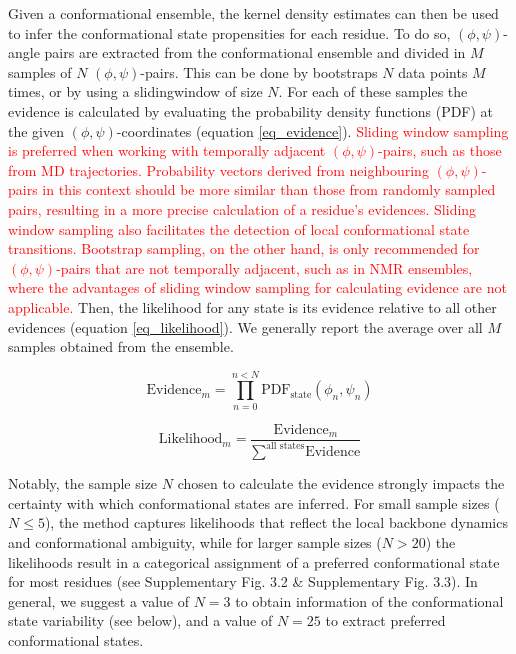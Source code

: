 Given a conformational ensemble, the kernel density estimates can then be used to infer the conformational state propensities for each residue. To do so, $(\phi, \psi)$-angle pairs  are extracted from the conformational ensemble and divided in $M$ samples of $N$ $(\phi, \psi)$-pairs. This can be done by \glspl{bootstrap} $N$ data points $M$ times, or by using a \gls{slidingwindow} of size $N$. For each of these samples the evidence is calculated by evaluating the probability density functions (PDF) at the given $(\phi, \psi)$-coordinates (equation \ref{eq_evidence}). \textcolor{red}{Sliding window sampling is preferred when working with temporally adjacent $(\phi, \psi)$-pairs, such as those from MD trajectories. Probability vectors derived from neighbouring $(\phi, \psi)$-pairs in this context should be more similar than those from randomly sampled pairs, resulting in a more precise calculation of a residue's evidences. Sliding window sampling also facilitates the detection of local conformational state transitions. Bootstrap sampling, on the other hand, is only recommended for $(\phi, \psi)$-pairs that are not temporally adjacent, such as in NMR ensembles, where the advantages of sliding window sampling for calculating evidence are not applicable.} Then, the likelihood for any state is its evidence relative to all other evidences (equation \ref{eq_likelihood}). We generally report the average over all $M$ samples obtained from the ensemble.



\begin{equation}
\label{eq_evidence}
\text{Evidence}_m = \prod \limits_{n=0}^{ n < N} \text{PDF}_{\text{state}} (\phi_n, \psi_n)
\end{equation}

\begin{equation}
\label{eq_likelihood}
\text{Likelihood}_m = \frac { 
    \text{Evidence}_m
} {
    \sum\limits^{\text{all states}} \text{Evidence}
}
\end{equation}

Notably, the sample size $N$ chosen to calculate the evidence strongly impacts the certainty with which conformational states are inferred. For small sample sizes ($N \le 5$), the method captures likelihoods that reflect the local backbone dynamics and conformational ambiguity, while for larger sample sizes ($N > 20$) the likelihoods result in a categorical assignment of a preferred conformational state for most residues (see Supplementary Fig. 3.2 \& Supplementary Fig. 3.3).
In general, we suggest a value of $N = 3$ to obtain information of the conformational state variability (see below), and a value of $N = 25$ to extract preferred conformational states. 


